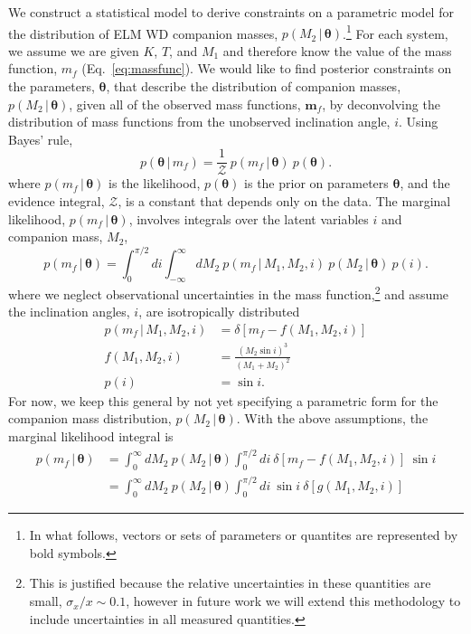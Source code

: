 \documentclass[apjl]{emulateapj}
\newcommand{\given}{\,|\,}
\newcommand{\bs}[1]{\boldsymbol{#1}}
\begin{document}
We construct a statistical model to derive constraints on a parametric model for the distribution of ELM WD companion masses, $p(M_2 \given \bs{\theta})$.\footnote{In what follows, vectors or sets of parameters or quantites are represented by bold symbols.} For each system, we assume we are given $K$, $T$, and $M_1$ and therefore know the value of the mass function, $m_f$ (Eq.~\ref{eq:massfunc}). We would like to find posterior constraints on the parameters, $\bs{\theta}$, that describe the distribution of companion masses, $p(M_2\given \bs{\theta})$, given all of the observed mass functions, $\bs{m}_f$, by deconvolving the distribution of mass functions from the unobserved inclination angle, $i$. Using Bayes' rule,
\begin{equation}
    p(\bs{\theta} \given m_f) = \frac{1}{\mathcal{Z}}~p(m_f \given \bs{\theta})~p(\bs{\theta}).
\end{equation}
where $p(m_f \given \bs{\theta})$ is the likelihood, $p(\bs{\theta})$ is the prior on parameters $\bs{\theta}$, and the evidence integral, $\mathcal{Z}$, is a constant that depends only on the data. The marginal likelihood, $p(m_f \given \bs{\theta})$, involves integrals over the latent variables $i$ and companion mass, $M_2$,
\begin{equation}
    p(m_f \given \bs{\theta}) = \int_0^{\pi/2} di \int_{-\infty}^\infty dM_2~p(m_f \given M_1, M_2, i)~p(M_2 \given \bs{\theta})~p(i).
\end{equation}
where we neglect observational uncertainties in the mass function,\footnote{This is justified because the relative uncertainties in these quantities are small, $\sigma_x / x \sim 0.1$, however in future work we will extend this methodology to include uncertainties in all measured quantities.} and assume the inclination angles, $i$, are isotropically distributed
\begin{align}
	p(m_f \given M_1, M_2, i) &= \delta \left[m_f - f(M_1, M_2, i) \right]\\
	f(M_1, M_2, i) &= \frac{(M_2 \sin i)^3}{(M_1 + M_2)^2}\\
	p(i) &= \sin i.
\end{align}
For now, we keep this general by not yet specifying a parametric form for the companion mass distribution, $p(M_2 \given \bs{\theta})$. With the above assumptions, the marginal likelihood integral is
\begin{align}
    p(m_f \given \bs{\theta}) &= \int_{0}^\infty dM_2~p(M_2 \given \bs{\theta}) \int_0^{\pi/2} di ~ \delta \left[m_f - f(M_1, M_2, i)\right]~\sin i\\
    &= \int_{0}^\infty dM_2~p(M_2 \given \bs{\theta}) \int_0^{\pi/2} di ~\sin i ~ \delta \left[g(M_1,M_2,i) \right]\label{eq:delta}
\end{align}
\end{document}

